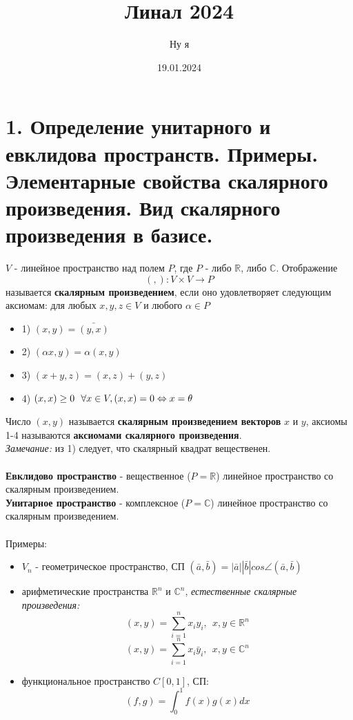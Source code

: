 \documentclass[14pt]{extarticle}
\title{Линал 2024}
\author{Ну я}
\date{19.01.2024}
\begin{document}
\maketitle
\tableofcontents

\section{1.	Определение унитарного и евклидова пространств. 
Примеры. Элементарные свойства скалярного произведения. 
Вид скалярного произведения в базисе.}

$V$ - линейное пространство над полем $P$, где $P$ - либо 
$\mathbb{R}$, либо $\mathbb{C}$. Отображение 
$$(,): V \times V \rightarrow P $$
называется \textbf{скалярным произведением}, если оно удовлетворяет 
следующим аксиомам: для любых $x, y, z \in V$ и любого $\alpha \in P$
\begin{itemize}
  \item 1) $(x,y) = \bar{(y,x)}$
  \item 2) $(\alpha x, y) = \alpha (x,y)$
  \item 3) $(x+y, z) = (x, z) + (y, z)$
  \item 4) $(x,x) \geq 0 \ \ \forall x \in V, \\
            (x,x) = 0 \Leftrightarrow x = \theta$
\end{itemize}
Число $(x,y)$ называется \textbf{скалярным произведением векторов} 
$x$ и $y$, аксиомы 1-4 называются \textbf{аксиомами скалярного 
произведения}. \\
\textsl{Замечание:} из 1) следует, что скалярный квадрат вещественен.\\\\
\textbf{Евклидово пространство} - вещественное ($P = \mathbb{R}$) линейное 
пространство со скалярным произведением.\\
\textbf{Унитарное пространство} - комплексное ($P = \mathbb{C}$) линейное 
пространство со скалярным произведением.\\\\
Примеры:
\begin{itemize}
  \item $V_n$ - геометрическое пространство, 
  СП $(\bar a, \bar b) = |\bar a||\bar b|cos \angle (\bar a, \bar b)$
  \item арифметические пространства $\mathbb{R}^n$ и $\mathbb{C}^n$,
  \textsl{естественные скалярные произведения:}
  $$(x,y) = \sum_{i=1}^{n} x_i y_i, \ \ x,y \in \mathbb{R}^n $$
  $$(x,y) = \sum_{i=1}^{n} x_i \bar y_i, \ \ x,y \in \mathbb{C}^n $$
  \item функциональное пространство $C[0,1]$, СП:
  $$(f,g) = \int_{0}^{1} f(x) g(x) dx $$ 
\end{itemize}
\end{document}
